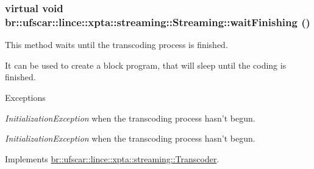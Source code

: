 \hypertarget{classbr_1_1ufscar_1_1lince_1_1xpta_1_1streaming_1_1Streaming_ab0f85c46efde46613539316340daa721}{
\subsubsection[{waitFinishing}]{\setlength{\rightskip}{0pt plus 5cm}virtual void br::ufscar::lince::xpta::streaming::Streaming::waitFinishing ()}}
\label{classbr_1_1ufscar_1_1lince_1_1xpta_1_1streaming_1_1Streaming_ab0f85c46efde46613539316340daa721}


This method waits until the transcoding process is finished. 

It can be used to create a block program, that will sleep until the coding is finished. 
\begin{DoxyExceptions}{Exceptions}
\item[{\em InitializationException}]when the transcoding process hasn't begun. \item[{\em InitializationException}]when the transcoding process hasn't begun. \end{DoxyExceptions}


Implements \hyperlink{classbr_1_1ufscar_1_1lince_1_1xpta_1_1streaming_1_1Transcoder_ac060d2266b2b4b41b1f62eb0c6a48be3}{br::ufscar::lince::xpta::streaming::Transcoder}.



